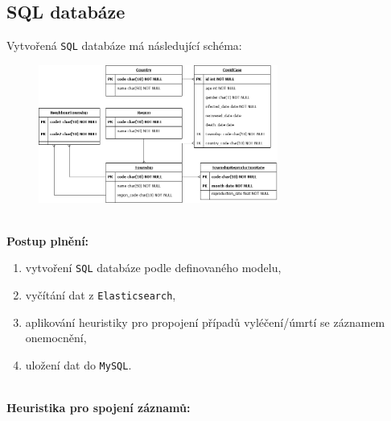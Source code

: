 \documentclass[11pt,a4paper,titlepage]{article}
\begin{document}
\newpage
\subsection{SQL databáze}
Vytvořená \texttt{SQL} databáze má následující schéma:
\newline \newline
\begin{figure}[h]
    \centering
    \includegraphics[width=0.70\textwidth]{img/sql_schema.png}
    \label{fig:}
\end{figure}
\\
\textbf{Postup plnění:}
\begin{enumerate}
    \item vytvoření \texttt{SQL} databáze podle definovaného modelu,
    \item vyčítání dat z \texttt{Elasticsearch},
    \item aplikování heuristiky pro propojení případů vyléčení/úmrtí se záznamem onemocnění,
    \item uložení dat do \texttt{MySQL}.
\end{enumerate}
\\
\textbf{Heuristika pro spojení záznamů:}
\end{document}

